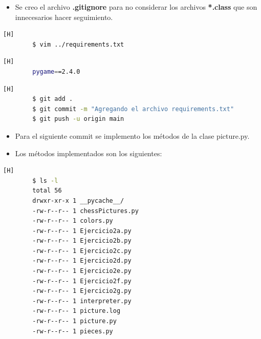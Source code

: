 \documentclass{article}
\begin{document}
	\begin{itemize}	
		\item Se creo el archivo \textbf{.gitignore} para no considerar los archivos \textbf{*.class} que son innecesarios hacer seguimiento.
	\end{itemize}
	\begin{lstlisting}[language=bash,caption={Creando requirements.txt}][H]
		$ vim ../requirements.txt
	\end{lstlisting}
	\begin{lstlisting}[language=bash,caption={../requirements.txt}][H]
		pygame==2.4.0
	\end{lstlisting}
	\begin{lstlisting}[language=bash,caption={Commit: Creando requirements.txt para especificar las verciones de las librerias}][H]
		$ git add .
		$ git commit -m "Agregando el archivo requirements.txt"			
		$ git push -u origin main
	\end{lstlisting}
	
	\begin{itemize}	
		\item Para el siguiente commit se implemento los métodos de la clase picture.py.
		\item Los métodos implementados son los siguientes:
	\end{itemize}	
	
	
	
	\begin{lstlisting}[language=bash,caption={Para el siguiente commit se implementaron los Ejercicios 2a hasta el 2g.}][H]
		$ ls -l
		total 56
		drwxr-xr-x 1 __pycache__/
		-rw-r--r-- 1 chessPictures.py
		-rw-r--r-- 1 colors.py
		-rw-r--r-- 1 Ejercicio2a.py
		-rw-r--r-- 1 Ejercicio2b.py
		-rw-r--r-- 1 Ejercicio2c.py
		-rw-r--r-- 1 Ejercicio2d.py
		-rw-r--r-- 1 Ejercicio2e.py
		-rw-r--r-- 1 Ejercicio2f.py
		-rw-r--r-- 1 Ejercicio2g.py
		-rw-r--r-- 1 interpreter.py
		-rw-r--r-- 1 picture.log
		-rw-r--r-- 1 picture.py
		-rw-r--r-- 1 pieces.py
	\end{lstlisting}
		
	
	
	
	
	
	
	
\end{document}
